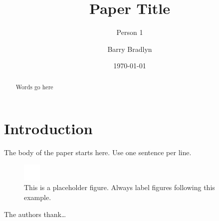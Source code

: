 \documentclass[prb,aps,amssymb,twocolumn,superscriptaddress,notitlepage]{revtex4-2}
\begin{document}
\title{Paper Title}
\author{Person 1}

\author{Barry Bradlyn}

\date{\today}

\begin{abstract}
Words go here
\end{abstract}
\maketitle

\section{Introduction}
The body of the paper starts here.
Use one sentence per line.

\begin{figure}[ht]
\includegraphics[width=\columnwidth]{placeholder.png}
\caption{This is a placeholder figure. 
Always label figures following this example.}\label{fig:placeholder}
\end{figure}

\begin{acknowledgments}
The authors thank\dots
\end{acknowledgments}



\end{document}
